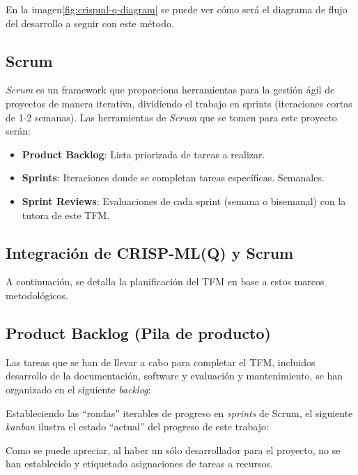 En la imagen\ref{fig:crispml-q-diagram} se puede ver cómo será el diagrama de flujo del desarrollo a seguir con este método.

\subsection{Scrum}

\emph{Scrum} es un framework que proporciona herramientas para la gestión ágil de proyectos de manera iterativa, dividiendo el trabajo en sprints (iteraciones cortas de 1-2 semanas). Las herramientas de \emph{Scrum} que se tomen para este proyecto serán:

\begin{itemize}
    \item \textbf{Product Backlog}: Lista priorizada de tareas a realizar.
    \item \textbf{Sprints}: Iteraciones donde se completan tareas específicas. Semanales.
    \item \textbf{Sprint Reviews}: Evaluaciones de cada sprint (semana o bisemanal) con la tutora de este TFM.
\end{itemize}

\subsection{Integración de CRISP-ML(Q) y Scrum}

A continuación, se detalla la planificación del TFM en base a estos marcos metodológicos.

\subsection{Product Backlog (Pila de producto)}

Las tareas que se han de llevar a cabo para completar el TFM, incluidos desarrollo de la documentación, software y evaluación y mantenimiento, se han organizado en el siguiente \emph{backlog}:



\clearpage

\clearpage
% 
Estableciendo las ``rondas'' iterables de progreso en \emph{sprints} de Scrum, el siguiente \emph{kanban} ilustra el estado ``actual'' del progreso de este trabajo:

%
\clearpage
Como se puede apreciar, al haber un sólo desarrollador para el proyecto, no se han establecido y etiquetado asignaciones de tareas a recursos.

